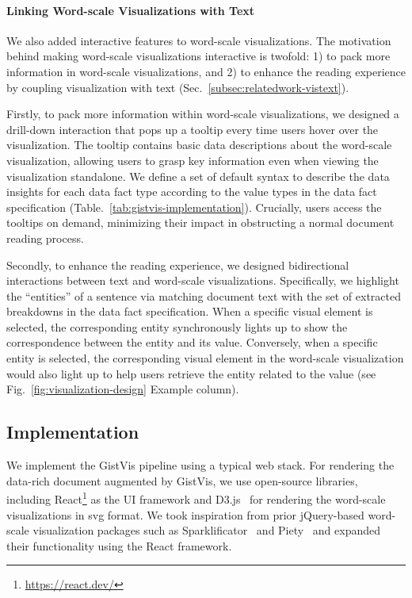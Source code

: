 

\paragraph{Linking Word-scale Visualizations with Text}
We also added interactive features to word-scale visualizations. The motivation behind making word-scale visualizations interactive is twofold: 1) to pack more information in word-scale visualizations, and 2) to enhance the reading experience by coupling visualization with text (Sec.~\ref{subsec:relatedwork-vistext}). 

Firstly, to pack more information within word-scale visualizations, we designed a drill-down interaction that pops up a tooltip every time users hover over the visualization. The tooltip contains basic data descriptions about the word-scale visualization, allowing users to grasp key information even when viewing the visualization standalone. We define a set of default syntax to describe the data insights for each data fact type according to the value types in the data fact specification (Table.~\ref{tab:gistvis-implementation}). Crucially, users access the tooltips on demand, minimizing their impact in obstructing a normal document reading process.


Secondly, to enhance the reading experience, we designed bidirectional interactions between text and word-scale visualizations. Specifically,
we highlight the ``entities'' of a sentence via matching document text with the set of extracted breakdowns in the data fact specification. When a specific visual element is selected, the corresponding entity synchronously lights up to show the correspondence between the entity and its value. Conversely, when a specific entity is selected, the corresponding visual element in the word-scale visualization would also light up to help users retrieve the entity related to the value (see Fig.~\ref{fig:visualization-design} Example column).

\subsection{Implementation}
\label{sec:implementation-detail}
We implement the GistVis pipeline using a typical web stack. For rendering the data-rich document augmented by GistVis, we use open-source libraries, including React\footnote{\url{https://react.dev/}} as the UI framework and D3.js~\cite{bostock2011datadriven} for rendering the word-scale visualizations in svg format. We took inspiration from prior jQuery-based word-scale visualization packages such as Sparklificator~\cite{sparklificator-package} and Piety~\cite{piety-package} and expanded their functionality using the React framework.

